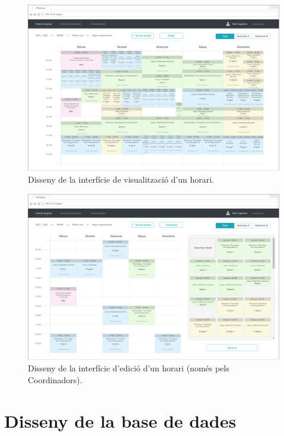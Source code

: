 \documentclass[a4paper,12pt]{ThesisStyle}
\begin{document}
\begin{figure}[H]
  \centering
  \includegraphics[width=\textwidth]{assets/interfaces/coordinadors/horarisGraus/visualitzacio.pdf}
  \caption{\label{img:horarisGraus_visualitzacio}Disseny de la interfície de visualització d'un horari.}
\end{figure}

\begin{figure}[H]
  \centering
  \includegraphics[width=\textwidth]{assets/interfaces/coordinadors/horarisGraus/edicio.pdf}
  \caption{\label{img:horarisGraus_edicio}Disseny de la interfície d'edició d'un horari (només pels Coordinadors).}
\end{figure}

\section{Disseny de la base de dades}
\label{disseny_bdd}
\end{document}
